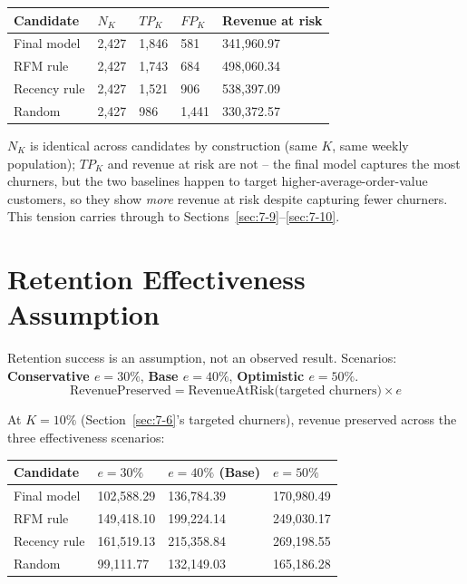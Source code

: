 \begin{center}
\begin{tabular}{@{}p{2.8cm}p{1.6cm}p{1.6cm}p{1.6cm}p{2.8cm}@{}}
    \toprule
    Candidate & $N_K$ & $TP_K$ & $FP_K$ & Revenue at risk \\
    \midrule
    Final model & 2,427 & 1,846 & 581 & 341,960.97 \\
    RFM rule & 2,427 & 1,743 & 684 & 498,060.34 \\
    Recency rule & 2,427 & 1,521 & 906 & 538,397.09 \\
    Random & 2,427 & 986 & 1,441 & 330,372.57 \\
    \bottomrule
\end{tabular}
\end{center}

$N_K$ is identical across candidates by construction (same $K$, same weekly population); $TP_K$ and revenue at risk are not -- the final model captures the most churners, but the two baselines happen to target higher-average-order-value customers, so they show \emph{more} revenue at risk despite capturing fewer churners. This tension carries through to Sections~\ref{sec:7-9}--\ref{sec:7-10}.

\section{Retention Effectiveness Assumption}
\label{sec:7-7}

Retention success is an assumption, not an observed result. Scenarios: \textbf{Conservative $e = 30\%$}, \textbf{Base $e = 40\%$}, \textbf{Optimistic $e = 50\%$}.
\begin{equation*}
    \text{RevenuePreserved} = \text{RevenueAtRisk(targeted churners)} \times e
\end{equation*}

At $K=10\%$ (Section~\ref{sec:7-6}'s targeted churners), revenue preserved across the three effectiveness scenarios:

\begin{center}
\begin{tabular}{@{}p{2.8cm}p{2.6cm}p{2.6cm}p{2.6cm}@{}}
    \toprule
    Candidate & $e=30\%$ & $e=40\%$ (Base) & $e=50\%$ \\
    \midrule
    Final model & 102,588.29 & 136,784.39 & 170,980.49 \\
    RFM rule & 149,418.10 & 199,224.14 & 249,030.17 \\
    Recency rule & 161,519.13 & 215,358.84 & 269,198.55 \\
    Random & 99,111.77 & 132,149.03 & 165,186.28 \\
    \bottomrule
\end{tabular}
\end{center}


